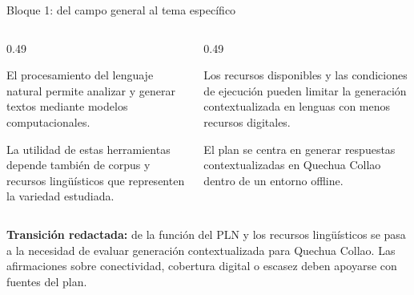 \documentclass[aspectratio=169,10pt,spanish]{beamer}
\begin{document}
\begin{frame}{Bloque 1: del campo general al tema específico}
    \begin{columns}[T,onlytextwidth]
        \begin{column}{0.49\textwidth}
            \begin{tcolorbox}[colback=bpLightGray,colframe=bpRust,title=\textbf{A. Campo}]
                \small El procesamiento del lenguaje natural permite analizar y generar textos mediante modelos computacionales.
            \end{tcolorbox}
            \begin{tcolorbox}[colback=white,colframe=bpGold!90!black,title=\textbf{B. Necesidad}]
                \small La utilidad de estas herramientas depende también de corpus y recursos lingüísticos que representen la variedad estudiada.
            \end{tcolorbox}
        \end{column}
        \begin{column}{0.49\textwidth}
            \begin{tcolorbox}[colback=white,colframe=bpRed,title=\textbf{C. Dificultad general}]
                \small Los recursos disponibles y las condiciones de ejecución pueden limitar la generación contextualizada en lenguas con menos recursos digitales.
            \end{tcolorbox}
            \begin{tcolorbox}[colback=bpBlue!6,colframe=bpBlue,title=\textbf{D. Delimitación}]
                \small El plan se centra en generar respuestas contextualizadas en Quechua Collao dentro de un entorno offline.
            \end{tcolorbox}
        \end{column}
    \end{columns}
    \vspace{0.05cm}
    \begin{tcolorbox}[colback=bpNavy,colframe=bpNavy,arc=1mm]
        \centering\scriptsize\color{white}
        \textbf{Transición redactada:} de la función del PLN y los recursos lingüísticos se pasa a la necesidad
        de evaluar generación contextualizada para Quechua Collao. Las afirmaciones sobre conectividad,
        cobertura digital o escasez deben apoyarse con fuentes del plan.
    \end{tcolorbox}
\end{frame}
\end{document}
